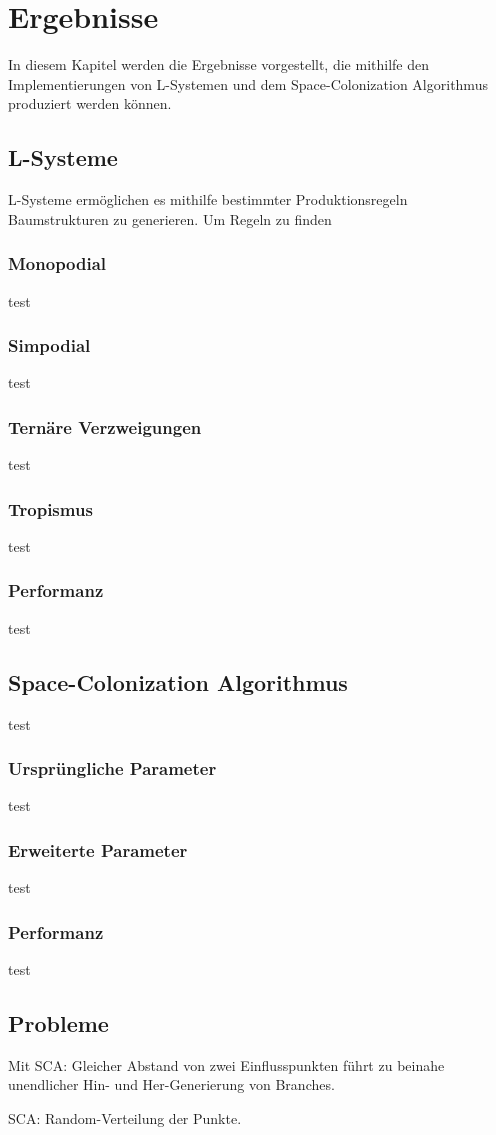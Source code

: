 \chapter{Ergebnisse}
In diesem Kapitel werden die Ergebnisse vorgestellt, die mithilfe den Implementierungen von L-Systemen und dem Space-Colonization Algorithmus produziert werden können.
\section{L-Systeme}
L-Systeme ermöglichen es mithilfe bestimmter Produktionsregeln Baumstrukturen zu generieren. Um Regeln zu finden
\subsection{Monopodial}
test
\subsection{Simpodial}
test
\subsection{Ternäre Verzweigungen}
test
\subsection{Tropismus}
test
\subsection{Performanz}
test
\section{Space-Colonization Algorithmus}
test
\subsection{Ursprüngliche Parameter}
test
\subsection{Erweiterte Parameter}
test
\subsection{Performanz}
test

\section{Probleme}

Mit SCA: Gleicher Abstand von zwei Einflusspunkten führt zu beinahe unendlicher Hin- und Her-Generierung von Branches.

SCA: Random-Verteilung der Punkte.